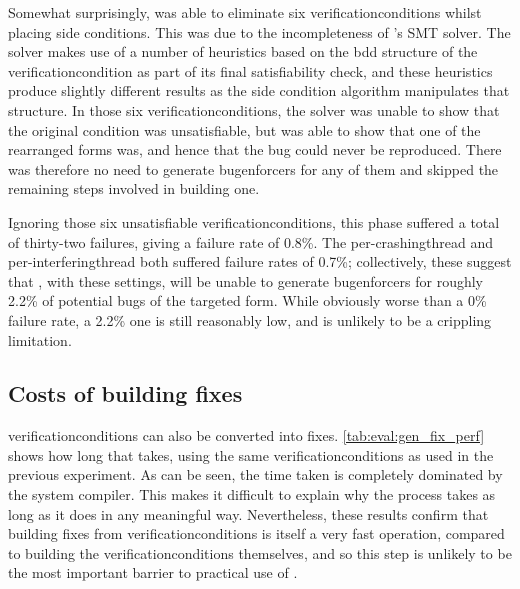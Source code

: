 Somewhat surprisingly, {\technique} was able to eliminate six
\glspl{verificationcondition} whilst placing side conditions.  This
was due to the incompleteness of {\technique}'s SMT solver.  The
solver makes use of a number of heuristics based on the \gls{bdd}
structure of the \gls{verificationcondition} as part of its final
satisfiability check, and these heuristics produce slightly different
results as the side condition algorithm manipulates that structure.
In those six \glspl{verificationcondition}, the solver was unable to
show that the original condition was unsatisfiable, but was able to
show that one of the rearranged forms was, and hence that the bug
could never be reproduced.  There was therefore no need to generate
\glspl{bugenforcer} for any of them and {\technique} skipped the
remaining steps involved in building one.

Ignoring those six unsatisfiable \glspl{verificationcondition}, this
phase suffered a total of thirty-two failures, giving a failure rate
of 0.8\%.  The per-\gls{crashingthread} and
per-\gls{interferingthread} both suffered failure rates of 0.7\%;
collectively, these suggest that {\technique}, with these settings,
will be unable to generate \glspl{bugenforcer} for roughly 2.2\% of
potential bugs of the targeted form.  While obviously worse than a 0\%
failure rate, a 2.2\% one is still reasonably low, and is unlikely to
be a crippling limitation.

\subsection{Costs of building fixes}

\Glspl{verificationcondition} can also be converted into fixes.
\autoref{tab:eval:gen_fix_perf} shows how long that takes, using the
same \glspl{verificationcondition} as used in the previous experiment.
As can be seen, the time taken is completely dominated by the system
compiler.  This makes it difficult to explain why the process takes as
long as it does in any meaningful way.  Nevertheless, these results
confirm that building fixes from \glspl{verificationcondition} is
itself a very fast operation, compared to building the
\glspl{verificationcondition} themselves, and so this step is unlikely
to be the most important barrier to practical use of {\technique}.

